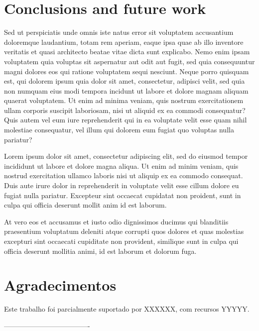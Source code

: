 \documentclass[a0,portrait]{a0poster}
\begin{document}
\begin{mdframed}[style=MyFrame]
\begin{multicols}{2}
\section{Conclusions and future work}

Sed ut perspiciatis unde omnis iste natus error sit voluptatem accusantium doloremque laudantium, totam rem aperiam, eaque ipsa quae ab illo inventore veritatis et quasi architecto beatae vitae dicta sunt explicabo. Nemo enim ipsam voluptatem quia voluptas sit aspernatur aut odit aut fugit, sed quia consequuntur magni dolores eos qui ratione voluptatem sequi nesciunt. Neque porro quisquam est, qui dolorem ipsum quia dolor sit amet, consectetur, adipisci velit, sed quia non numquam eius modi tempora incidunt ut labore et dolore magnam aliquam quaerat voluptatem. Ut enim ad minima veniam, quis nostrum exercitationem ullam corporis suscipit laboriosam, nisi ut aliquid ex ea commodi consequatur? Quis autem vel eum iure reprehenderit qui in ea voluptate velit esse quam nihil molestiae consequatur, vel illum qui dolorem eum fugiat quo voluptas nulla pariatur?

Lorem ipsum dolor sit amet, consectetur adipiscing elit, sed do eiusmod tempor incididunt ut labore et dolore magna aliqua. Ut enim ad minim veniam, quis nostrud exercitation ullamco laboris nisi ut aliquip ex ea commodo consequat. Duis aute irure dolor in reprehenderit in voluptate velit esse cillum dolore eu fugiat nulla pariatur. Excepteur sint occaecat cupidatat non proident, sunt in culpa qui officia deserunt mollit anim id est laborum.

At vero eos et accusamus et iusto odio dignissimos ducimus qui blanditiis praesentium voluptatum deleniti atque corrupti quos dolores et quas molestias excepturi sint occaecati cupiditate non provident, similique sunt in culpa qui officia deserunt mollitia animi, id est laborum et dolorum fuga.

\section*{Agradecimentos}
%
Este trabalho foi parcialmente suportado por XXXXXX, com recursos  YYYYY.

%
%

-------------------------------------
\end{multicols}
\begin{center}
\end{center}
\end{mdframed}
\end{document}
